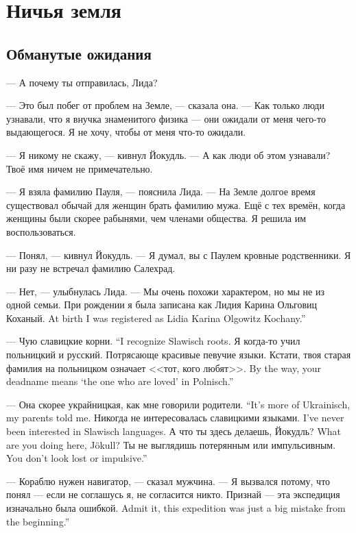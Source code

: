 \chapter{Ничья земля}

\section{Обманутые ожидания}

--- А почему ты отправилась, Лида?

--- Это был побег от проблем на Земле, --- сказала она.
--- Как только люди узнавали, что я внучка знаменитого физика --- они ожидали от меня чего-то выдающегося.
Я не хочу, чтобы от меня что-то ожидали.

--- Я никому не скажу, --- кивнул Йокудль.
--- А как люди об этом узнавали?
Твоё имя ничем не примечательно.

--- Я взяла фамилию Пауля, --- пояснила Лида.
--- На Земле долгое время существовал обычай для женщин брать фамилию мужа.
Ещё с тех времён, когда женщины были скорее рабынями, чем членами общества.
Я решила им воспользоваться.

--- Понял, --- кивнул Йокудль.
--- Я думал, вы с Паулем кровные родственники.
Я ни разу не встречал фамилию Салехрад. %

--- Нет, --- улыбнулась Лида.
--- Мы очень похожи характером, но мы не из одной семьи.
{При рождении я была записана как Лидия Карина Ольговиц Коханый.}
{At birth I was registered as Lidia Karina Olgowitz Kochany.''}

{--- Чую славицкие корни.}
{``I recognize Slawisch roots.}
Я когда-то учил польницкий и русский.
Потрясающе красивые певучие языки.
{Кстати, твоя старая фамилия на польницком означает <<тот, кого любят>>.}
{By the way, your deadname means `the one who are loved' in Polnisch.''}

{--- Она скорее украйницкая, как мне говорили родители.}
{``It's more of Ukrainisch, my parents told me.}
{Никогда не интересовалась славицкими языками.}
{I've never been interested in Slawisch languages.}
{А что ты здесь делаешь, Йокудль?}
{What are you doing here, Jökull?}
{Ты не выглядишь потерянным или импульсивным.}
{You don't look lost or impulsive.''}

--- Кораблю нужен навигатор, --- сказал мужчина.
--- Я вызвался потому, что понял --- если не соглашусь я, не согласится никто.
{Признай --- эта экспедиция изначально была ошибкой.}
{Admit it, this expedition was just a big mistake from the beginning.''}

